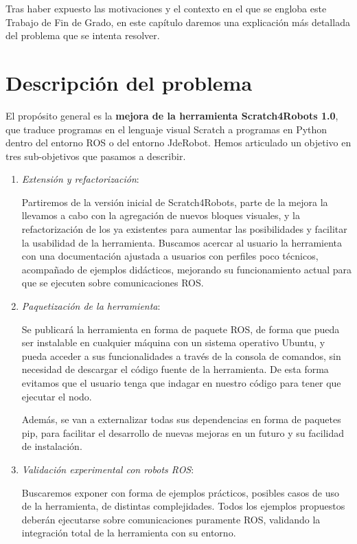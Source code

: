 Tras haber expuesto las motivaciones y el contexto en el que se engloba este Trabajo de Fin de Grado, en este capítulo daremos una explicación más detallada del problema que se intenta resolver.\\ 

\section{Descripción del problema}
\label{sec:descripcion del problema}
El propósito general es la \textbf{mejora de la herramienta Scratch4Robots 1.0}, que traduce programas en el lenguaje visual Scratch a programas en Python dentro del entorno ROS o del entorno JdeRobot. Hemos articulado un objetivo en tres sub-objetivos que pasamos a describir.
\begin{enumerate}
\item \textit{Extensión y refactorización}:

 Partiremos de la versión inicial de Scratch4Robots, parte de la mejora la llevamos a cabo con la agregación de nuevos bloques visuales, y la refactorización de los ya existentes para aumentar las posibilidades y facilitar la usabilidad de la herramienta. Buscamos acercar al usuario la herramienta con una documentación ajustada a usuarios con perfiles poco técnicos, acompañado de ejemplos didácticos, mejorando su funcionamiento actual para que se ejecuten sobre comunicaciones ROS.

\item \textit{Paquetización de la herramienta}:

 Se publicará la herramienta en forma de paquete ROS, de forma que pueda ser instalable en cualquier máquina con un sistema operativo Ubuntu, y pueda acceder a sus funcionalidades a través de la consola de comandos, sin necesidad de descargar el código fuente de la herramienta. De esta forma evitamos que el usuario tenga que indagar en nuestro código para tener que ejecutar el nodo.

 Además, se van a externalizar todas sus dependencias en forma de paquetes pip, para facilitar el desarrollo de nuevas mejoras en un futuro y su facilidad de instalación.

\item \textit{Validación experimental con robots ROS}:

 Buscaremos exponer con forma de ejemplos prácticos, posibles casos de uso de la herramienta, de distintas complejidades. Todos los ejemplos propuestos deberán ejecutarse sobre comunicaciones puramente ROS, validando la integración total de la herramienta con su entorno.
\end{enumerate}


